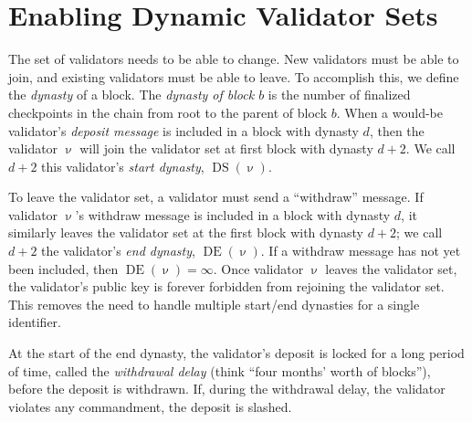 \documentclass[12pt]{article}
\newcommand{\DS}{\operatorname{DS}}
\newcommand{\DE}{\operatorname{DE}}
\begin{document}
\section{Enabling Dynamic Validator Sets}
\label{sect:join_and_leave}

The set of validators needs to be able to change.  New validators must be able to join, and existing validators must be able to leave.  To accomplish this, we define the \textit{dynasty} of a block.  The \emph{dynasty of block $b$} is the number of finalized checkpoints in the chain from root to the parent of block $b$.  When a would-be validator's \emph{deposit message} is included in a block with dynasty $d$, then the validator $\upnu$ will join the validator set at first block with dynasty $d+2$.  We call $d+2$ this validator's \textit{start dynasty}, $\DS(\upnu)$.


To leave the validator set, a validator must send a ``withdraw'' message. If validator $\upnu$'s  withdraw message is included in a block with dynasty $d$, it similarly leaves the validator set at the first block with dynasty $d+2$; we call $d+2$ the validator's \textit{end dynasty}, $\DE(\upnu)$.  If a withdraw message has not yet been included, then $\DE(\upnu) = \infty$.  Once validator $\upnu$ leaves the validator set, the validator's public key is forever forbidden from rejoining the validator set.  This removes the need to handle multiple start/end dynasties for a single identifier.


At the start of the end dynasty, the validator's deposit is locked for a long period of time, called the \textit{withdrawal delay} (think ``four months' worth of blocks''), before the deposit is withdrawn.  If, during the withdrawal delay, the validator violates any commandment, the deposit is slashed.
\end{document}
